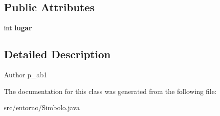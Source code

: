 \subsection*{Public Attributes}
\begin{DoxyCompactItemize}
\item 
\mbox{\label{classentorno_1_1_simbolo_a26bbe6ff1d532cc556594e89034b41bb}} 
int {\bfseries lugar}
\end{DoxyCompactItemize}


\subsection{Detailed Description}
\begin{DoxyAuthor}{Author}
p\+\_\+ab1 
\end{DoxyAuthor}


The documentation for this class was generated from the following file\+:\begin{DoxyCompactItemize}
\item 
src/entorno/Simbolo.\+java\end{DoxyCompactItemize}
